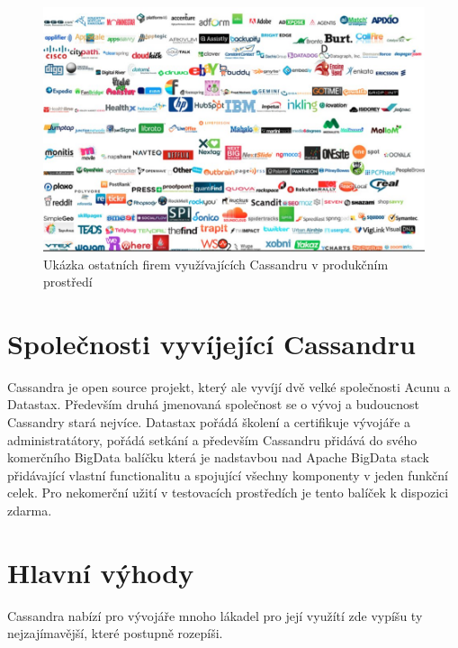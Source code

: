 \begin{figure}[h]
\centering
\includegraphics[scale=0.45]{images/casa-production}
\caption{Ukázka ostatních firem využívajících Cassandru v produkčním prostředí}
\label{fig:yarn}
\end{figure}


\section{Společnosti vyvíjející Cassandru}
Cassandra je open source projekt, který ale vyvíjí dvě velké společnosti Acunu a Datastax. Především druhá jmenovaná společnost se o vývoj a budoucnost Cassandry stará nejvíce. Datastax pořádá školení a certifikuje vývojáře a administratátory, pořádá setkání a především  Cassandru přidává do svého komerčního BigData balíčku která je nadstavbou nad Apache BigData stack přidávající vlastní functionalitu a spojující všechny komponenty v jeden funkční celek. Pro nekomerční užití v testovacích prostředích je tento balíček k dispozici zdarma.
\section{Hlavní výhody}

Cassandra nabízí pro vývojáře mnoho lákadel pro její využítí zde vypíšu ty nejzajímavější, které postupně rozepíši. 


